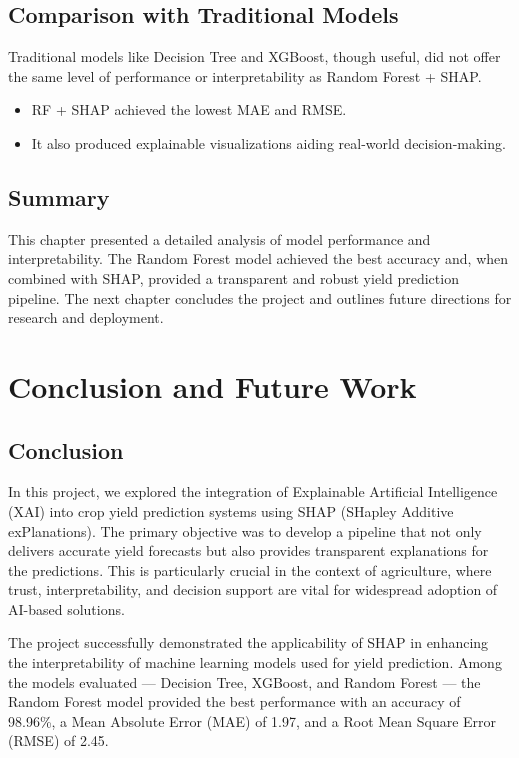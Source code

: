 \documentclass[a4paper,11pt,oneside]{book}
\begin{document}
\section{Comparison with Traditional Models}

Traditional models like Decision Tree and XGBoost, though useful, did not offer the same level of performance or interpretability as Random Forest + SHAP.

\begin{itemize}
    \item RF + SHAP achieved the lowest MAE and RMSE.
    \item It also produced explainable visualizations aiding real-world decision-making.
\end{itemize}

\section{Summary}

This chapter presented a detailed analysis of model performance and interpretability. The Random Forest model achieved the best accuracy and, when combined with SHAP, provided a transparent and robust yield prediction pipeline. The next chapter concludes the project and outlines future directions for research and deployment.

\newpage



\chapter{Conclusion and Future Work}

\section{Conclusion}

In this project, we explored the integration of Explainable Artificial Intelligence (XAI) into crop yield prediction systems using SHAP (SHapley Additive exPlanations). The primary objective was to develop a pipeline that not only delivers accurate yield forecasts but also provides transparent explanations for the predictions. This is particularly crucial in the context of agriculture, where trust, interpretability, and decision support are vital for widespread adoption of AI-based solutions.

The project successfully demonstrated the applicability of SHAP in enhancing the interpretability of machine learning models used for yield prediction. Among the models evaluated — Decision Tree, XGBoost, and Random Forest — the Random Forest model provided the best performance with an accuracy of 98.96\%, a Mean Absolute Error (MAE) of 1.97, and a Root Mean Square Error (RMSE) of 2.45.
\end{document}
